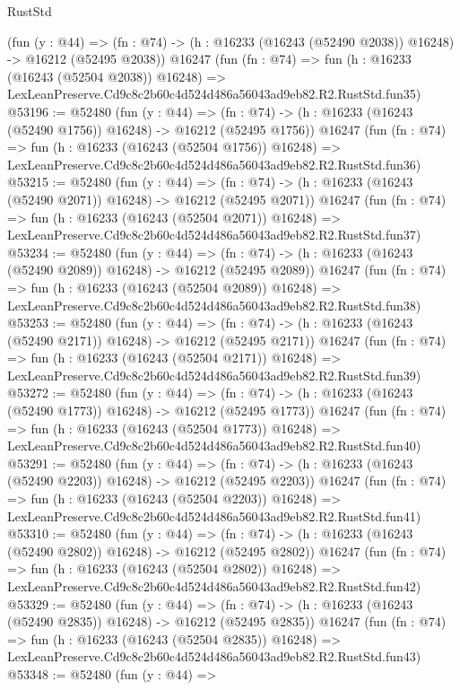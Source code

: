 \begin{lexlean}{RustStd}
\begin{coremodule}
    (fun (y : @44) =>
    (fn : @74) -> (h : @16233 (@16243 (@52490 @2038)) @16248) -> @16212 (@52495 @2038))
    @16247
    (fun (fn : @74) =>
    fun (h : @16233 (@16243 (@52504 @2038)) @16248) =>
    LexLeanPreserve.Cd9c8c2b60c4d524d486a56043ad9eb82.R2.RustStd.fun35)
@53196 := @52480
    (fun (y : @44) =>
    (fn : @74) -> (h : @16233 (@16243 (@52490 @1756)) @16248) -> @16212 (@52495 @1756))
    @16247
    (fun (fn : @74) =>
    fun (h : @16233 (@16243 (@52504 @1756)) @16248) =>
    LexLeanPreserve.Cd9c8c2b60c4d524d486a56043ad9eb82.R2.RustStd.fun36)
@53215 := @52480
    (fun (y : @44) =>
    (fn : @74) -> (h : @16233 (@16243 (@52490 @2071)) @16248) -> @16212 (@52495 @2071))
    @16247
    (fun (fn : @74) =>
    fun (h : @16233 (@16243 (@52504 @2071)) @16248) =>
    LexLeanPreserve.Cd9c8c2b60c4d524d486a56043ad9eb82.R2.RustStd.fun37)
@53234 := @52480
    (fun (y : @44) =>
    (fn : @74) -> (h : @16233 (@16243 (@52490 @2089)) @16248) -> @16212 (@52495 @2089))
    @16247
    (fun (fn : @74) =>
    fun (h : @16233 (@16243 (@52504 @2089)) @16248) =>
    LexLeanPreserve.Cd9c8c2b60c4d524d486a56043ad9eb82.R2.RustStd.fun38)
@53253 := @52480
    (fun (y : @44) =>
    (fn : @74) -> (h : @16233 (@16243 (@52490 @2171)) @16248) -> @16212 (@52495 @2171))
    @16247
    (fun (fn : @74) =>
    fun (h : @16233 (@16243 (@52504 @2171)) @16248) =>
    LexLeanPreserve.Cd9c8c2b60c4d524d486a56043ad9eb82.R2.RustStd.fun39)
@53272 := @52480
    (fun (y : @44) =>
    (fn : @74) -> (h : @16233 (@16243 (@52490 @1773)) @16248) -> @16212 (@52495 @1773))
    @16247
    (fun (fn : @74) =>
    fun (h : @16233 (@16243 (@52504 @1773)) @16248) =>
    LexLeanPreserve.Cd9c8c2b60c4d524d486a56043ad9eb82.R2.RustStd.fun40)
@53291 := @52480
    (fun (y : @44) =>
    (fn : @74) -> (h : @16233 (@16243 (@52490 @2203)) @16248) -> @16212 (@52495 @2203))
    @16247
    (fun (fn : @74) =>
    fun (h : @16233 (@16243 (@52504 @2203)) @16248) =>
    LexLeanPreserve.Cd9c8c2b60c4d524d486a56043ad9eb82.R2.RustStd.fun41)
@53310 := @52480
    (fun (y : @44) =>
    (fn : @74) -> (h : @16233 (@16243 (@52490 @2802)) @16248) -> @16212 (@52495 @2802))
    @16247
    (fun (fn : @74) =>
    fun (h : @16233 (@16243 (@52504 @2802)) @16248) =>
    LexLeanPreserve.Cd9c8c2b60c4d524d486a56043ad9eb82.R2.RustStd.fun42)
@53329 := @52480
    (fun (y : @44) =>
    (fn : @74) -> (h : @16233 (@16243 (@52490 @2835)) @16248) -> @16212 (@52495 @2835))
    @16247
    (fun (fn : @74) =>
    fun (h : @16233 (@16243 (@52504 @2835)) @16248) =>
    LexLeanPreserve.Cd9c8c2b60c4d524d486a56043ad9eb82.R2.RustStd.fun43)
@53348 := @52480
    (fun (y : @44) =>

\end{coremodule}
\end{lexlean}
